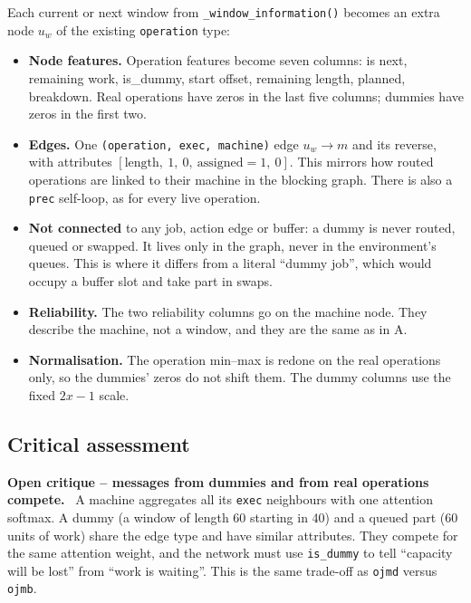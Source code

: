 \documentclass[11pt,a4paper]{article}
\newenvironment{critique}[1]{%
  \par\medskip\noindent\textbf{\color{critic}Open critique -- #1.}\ }{\par\medskip}
\newcommand{\code}[1]{\texttt{#1}}
\begin{document}
Each current or next window from \code{\_window\_information()} becomes an extra node $u_w$ of
the existing \code{operation} type:
\begin{itemize}[nosep]
  \item \textbf{Node features.} Operation features become seven columns: is next, remaining
        work, is\_dummy, start offset, remaining length, planned, breakdown. Real operations have
        zeros in the last five columns; dummies have zeros in the first two.
  \item \textbf{Edges.} One \code{(operation, exec, machine)} edge $u_w\to m$ and its reverse,
        with attributes $[\text{length},\ 1,\ 0,\ \text{assigned}=1,\ 0]$. This mirrors how routed
        operations are linked to their machine in the blocking graph. There is also a \code{prec}
        self-loop, as for every live operation.
  \item \textbf{Not connected} to any job, action edge or buffer: a dummy is never routed,
        queued or swapped. It lives only in the graph, never in the environment's queues. This
        is where it differs from a literal ``dummy job'', which would occupy a buffer slot and
        take part in swaps.
  \item \textbf{Reliability.} The two reliability columns go on the machine node. They describe
        the machine, not a window, and they are the same as in A.
  \item \textbf{Normalisation.} The operation min--max is redone on the real operations only, so
        the dummies' zeros do not shift them. The dummy columns use the fixed $2x-1$ scale.
\end{itemize}

\subsection{Critical assessment}

\begin{critique}{messages from dummies and from real operations compete}
A machine aggregates all its \code{exec} neighbours with one attention softmax. A dummy (a
window of length 60 starting in 40) and a queued part (60 units of work) share the edge type
and have similar attributes. They compete for the same attention weight, and the network must
use \code{is\_dummy} to tell ``capacity will be lost'' from ``work is waiting''. This is the
same trade-off as \code{ojmd} versus \code{ojmb}.
\end{critique}
\end{document}
